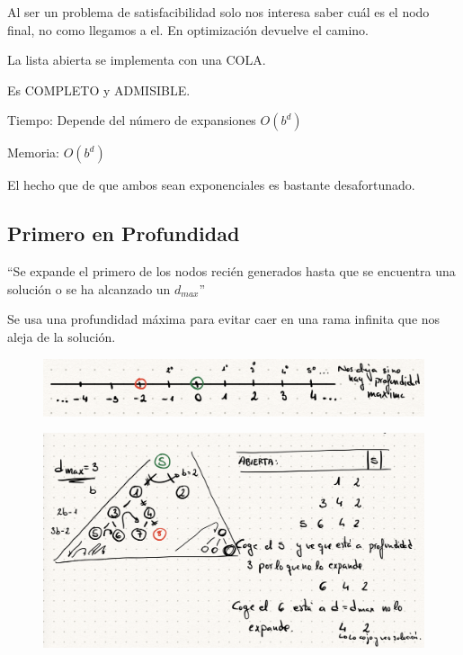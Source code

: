 \documentclass[12pt, twoside, openright]{report} %
\begin{document}
	Al ser un problema de satisfacibilidad solo nos interesa saber cuál es
    el nodo final, no como llegamos a el. En optimización devuelve el
    camino.

	La lista abierta se implementa con una COLA.

	Es COMPLETO y ADMISIBLE.

	Tiempo: Depende del número de expansiones \(O(b^d)\)

	Memoria: \(O(b^d)\)

	El hecho que de que ambos sean exponenciales es bastante
    desafortunado.

\subsection{Primero en Profundidad}

  ``Se expande el primero de los nodos recién generados hasta que se
  encuentra una solución o se ha alcanzado un \(d_{max}\)''

  
    Se usa una profundidad máxima para evitar caer en una rama infinita
    que nos aleja de la solución.
	\begin{figure}[H]
		{\includegraphics[scale=.25]{Untitled 47.png}}
	\end{figure}
	\begin{figure}[H]
		{\includegraphics[scale=.2]{Untitled 48.png}}
	\end{figure}
 
\end{document}
